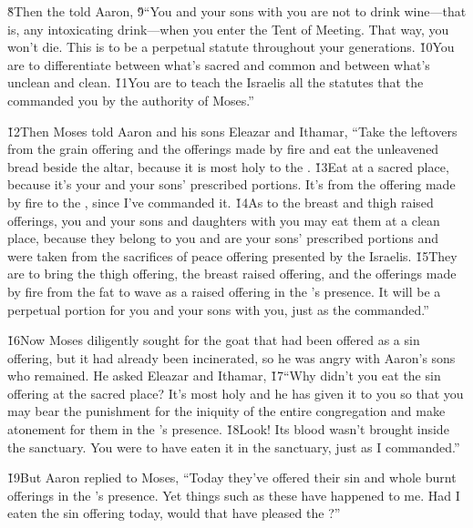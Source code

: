 \v{8}Then the  told Aaron, \v{9}``You and your sons with you are not to drink wine---that is, any intoxicating drink---when you enter the Tent of Meeting. That way, you won't die. This is to be a perpetual statute throughout your generations. \v{10}You are to differentiate between what's sacred and common and between what's unclean and clean. \v{11}You are to teach the Israelis all the statutes that the  commanded you by the authority of Moses.''

\v{12}Then Moses told Aaron and his sons Eleazar and Ithamar, ``Take the leftovers from the grain offering and the offerings made by fire and eat the unleavened bread beside the altar, because it is most holy to the . \v{13}Eat at a sacred place, because it's your and your sons' prescribed portions. It's from the offering made by fire to the , since I've commanded it. \v{14}As to the breast and thigh raised offerings, you and your sons and daughters with you may eat them at a clean place, because they belong to you and are your sons' prescribed portions and were taken from the sacrifices of peace offering presented by the Israelis. \v{15}They are to bring the thigh offering, the breast raised offering, and the offerings made by fire from the fat to wave as a raised offering in the 's presence. It will be a perpetual portion for you and your sons with you, just as the  commanded.''

\v{16}Now Moses diligently sought for the goat that had been offered as a sin offering, but it had already been incinerated, so he was angry with Aaron's sons who remained. He asked Eleazar and Ithamar, \v{17}``Why didn't you eat the sin offering at the sacred place? It's most holy and he has given it to you so that you may bear the punishment for the iniquity of the entire congregation and make atonement for them in the 's presence. \v{18}Look! Its blood wasn't brought inside the sanctuary. You were to have eaten it in the sanctuary, just as I commanded.''

\v{19}But Aaron replied to Moses, ``Today they've offered their sin and whole burnt offerings in the 's presence. Yet things such as these have happened to me. Had I eaten the sin offering today, would that have pleased the ?''


